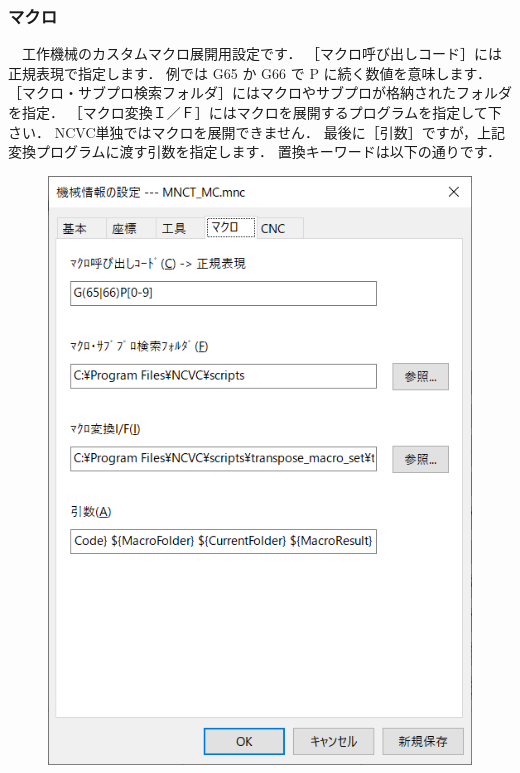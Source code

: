 \subsubsection{マクロ}
\begin{minipage}[t]{0.5\textwidth}
　工作機械のカスタムマクロ展開用設定です．
［マクロ呼び出しコード］には正規表現で指定します．
例では G65 か G66 で P に続く数値を意味します．
［マクロ・サブプロ検索フォルダ］にはマクロやサブプロが格納されたフォルダを指定．
［マクロ変換Ｉ／Ｆ］にはマクロを展開するプログラムを指定して下さい．
NCVC単独ではマクロを展開できません．
最後に［引数］ですが，上記変換プログラムに渡す引数を指定します．
置換キーワードは以下の通りです．
\end{minipage}
\begin{minipage}[t]{0.5\textwidth}
\vspace*{-2zh}
\begin{figure}[H]
\centering
\includegraphics[scale=0.7]{No6/fig/machine4.png}
\label{fig:machine4.png}
\end{figure}
\end{minipage}

